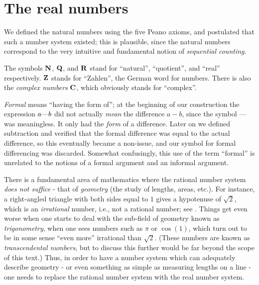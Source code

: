 \chapter{The real numbers} \label{ch 5}

\begin{note}
We defined the natural numbers using the five Peano axioms, and postulated that such a number system existed;
this is plausible, since the natural numbers correspond to the very intuitive and fundamental notion of \emph{sequential counting}.
\end{note}

\begin{note}
The symbols \(\mathbf{N}\), \(\mathbf{Q}\), and \(\mathbf{R}\) stand for ``natural'', ``quotient'', and ``real'' respectively.
\(\mathbf{Z}\) stands for ``Zahlen'', the German word for numbers.
There is also the \emph{complex numbers} \(\mathbf{C}\), which obviously stands for ``complex''.
\end{note}

\begin{note}
\emph{Formal} means ``having the form of'';
at the beginning of our construction the expression \(a \text{---} b\) did not actually \emph{mean} the difference \(a - b\), since the symbol \(\text{---}\) was meaningless.
It only had the \emph{form} of a difference.
Later on we defined subtraction and verified that the formal difference was equal to the actual difference, so this eventually became a non-issue, and our symbol for formal differencing was discarded.
Somewhat confusingly, this use of the term ``formal'' is unrelated to the notions of a formal argument and an informal argument.
\end{note}

\begin{note}
There is a fundamental area of mathematics where the rational number system \emph{does not suffice} - that of \emph{geometry} (the study of lengths, areas, etc.).
For instance, a right-angled triangle with both sides equal to \(1\) gives a hypotenuse of \(\sqrt{2}\), which is an \emph{irrational} number, i.e., not a rational number; see .
Things get even worse when one starts to deal with the sub-field of geometry known as \emph{trigonometry}, when one sees numbers such as \(\pi\) or \(\cos(1)\), which turn out to be in some sense ``even more'' irrational than \(\sqrt{2}\).
(These numbers are known as \emph{transcendental numbers}, but to discuss this further would be far beyond the scope of this text.)
Thus, in order to have a number system which can adequately describe geometry
- or even something as simple as measuring lengths on a line
- one needs to replace the rational number system with the real number system.
\end{note}

